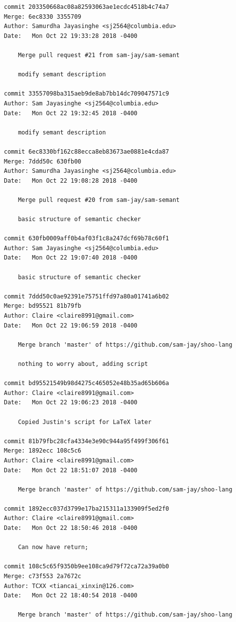 \documentclass[12pt]{article}
\begin{document}
\begin{lstlisting}
commit 203350668ac08a82593063ae1ecdc4518b4c74a7
Merge: 6ec8330 3355709
Author: Samurdha Jayasinghe <sj2564@columbia.edu>
Date:   Mon Oct 22 19:33:28 2018 -0400

    Merge pull request #21 from sam-jay/sam-semant
    
    modify semant description

commit 33557098ba315aeb9de8ab7bb14dc709047571c9
Author: Sam Jayasinghe <sj2564@columbia.edu>
Date:   Mon Oct 22 19:32:45 2018 -0400

    modify semant description

commit 6ec8330bf162c88ecca8eb83673ae0881e4cda87
Merge: 7ddd50c 630fb00
Author: Samurdha Jayasinghe <sj2564@columbia.edu>
Date:   Mon Oct 22 19:08:28 2018 -0400

    Merge pull request #20 from sam-jay/sam-semant
    
    basic structure of semantic checker

commit 630fb0009aff0b4af03f1c8a247dcf69b78c60f1
Author: Sam Jayasinghe <sj2564@columbia.edu>
Date:   Mon Oct 22 19:07:40 2018 -0400

    basic structure of semantic checker

commit 7ddd50c0ae92391e75751ffd97a80a01741a6b02
Merge: bd95521 81b79fb
Author: Claire <claire8991@gmail.com>
Date:   Mon Oct 22 19:06:59 2018 -0400

    Merge branch 'master' of https://github.com/sam-jay/shoo-lang
    
    nothing to worry about, adding script

commit bd95521549b98d4275c465052e48b35ad65b606a
Author: Claire <claire8991@gmail.com>
Date:   Mon Oct 22 19:06:23 2018 -0400

    Copied Justin's script for LaTeX later

commit 81b79fbc28cfa4334e3e90c944a95f499f306f61
Merge: 1892ecc 108c5c6
Author: Claire <claire8991@gmail.com>
Date:   Mon Oct 22 18:51:07 2018 -0400

    Merge branch 'master' of https://github.com/sam-jay/shoo-lang

commit 1892ecc037d3799e17ba215311a133909f5ed2f0
Author: Claire <claire8991@gmail.com>
Date:   Mon Oct 22 18:50:46 2018 -0400

    Can now have return;

commit 108c5c65f9350b9ee108ca9d79f72ca72a39a0b0
Merge: c73f553 2a7672c
Author: TCXX <tiancai_xinxin@126.com>
Date:   Mon Oct 22 18:40:54 2018 -0400

    Merge branch 'master' of https://github.com/sam-jay/shoo-lang


\end{lstlisting}
\end{document}
